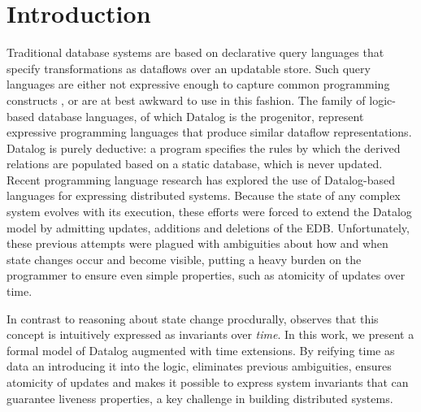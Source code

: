\section{Introduction}





Traditional database systems are based on declarative query languages that
specify transformations as dataflows over an updatable store.  Such query
languages are either not expressive enough to capture common programming
constructs , or are at best awkward to use in this fashion.
 The family of logic-based database languages, of
which Datalog is the progenitor, represent expressive programming languages
that produce similar dataflow representations.  Datalog is purely deductive: a
program specifies the rules by which the derived relations are populated based
on a static database, which is never updated.  Recent programming language
research has explored the use of Datalog-based languages for expressing
distributed systems.  Because the state of any complex system evolves with its
execution, these efforts were forced to extend the Datalog model by admitting
updates, additions and deletions of the EDB.  Unfortunately, these previous
attempts were plagued with ambiguities about how and when state changes occur
and become visible, putting a heavy burden on the programmer to ensure even
simple properties, such as atomicity of updates over time.

In contrast to reasoning about state change procdurally, \lang observes
that this concept is intuitively expressed as invariants over {\em time}.  In
this work, we present a formal model of Datalog augmented with time extensions.
By reifying time as data an introducing it into the logic, \lang eliminates
previous ambiguities, ensures atomicity of updates and makes it possible to
express system invariants that can guarantee liveness properties, a key
challenge in building distributed systems.
